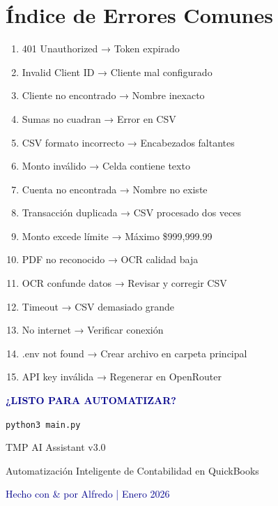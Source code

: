 \documentclass[12pt,oneside]{article}
\begin{document}
\section{Índice de Errores Comunes}

\begin{enumerate}
    \item 401 Unauthorized → Token expirado
    \item Invalid Client ID → Cliente mal configurado
    \item Cliente no encontrado → Nombre inexacto
    \item Sumas no cuadran → Error en CSV
    \item CSV formato incorrecto → Encabezados faltantes
    \item Monto inválido → Celda contiene texto
    \item Cuenta no encontrada → Nombre no existe
    \item Transacción duplicada → CSV procesado dos veces
    \item Monto excede límite → Máximo \$999,999.99
    \item PDF no reconocido → OCR calidad baja
    \item OCR confunde datos → Revisar y corregir CSV
    \item Timeout → CSV demasiado grande
    \item No internet → Verificar conexión
    \item .env not found → Crear archivo en carpeta principal
    \item API key inválida → Regenerar en OpenRouter
\end{enumerate}

\newpage

\begin{center}
    \vspace{3cm}
    \Large\textbf{\textcolor{darkblue}{¿LISTO PARA AUTOMATIZAR?}}
    
    \vspace{1cm}
    \texttt{python3 main.py}
    
    \vspace{2cm}
    \Large\textcolor{accent}{TMP AI Assistant v3.0}
    
    \vspace{0.5cm}
    \large Automatización Inteligente de Contabilidad en QuickBooks
    
    \vspace{3cm}
    \small\textcolor{darkblue}{Hecho con \& por Alfredo | Enero 2026}
\end{center}
\end{document}
